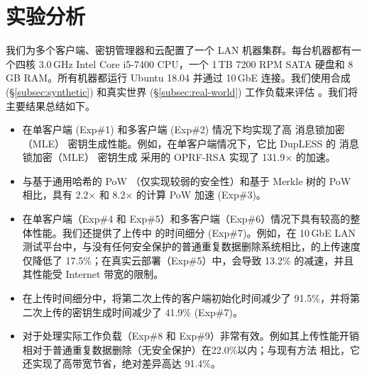 \section{实验分析}
\label{sec:evaluation}

我们为多个客户端、密钥管理器和云配置了一个 LAN 机器集群。每台机器都有一个四核 3.0\,GHz Intel Core i5-7400 CPU，一个 1\,TB 7200 RPM SATA 硬盘和 8\,GB RAM。所有机器都运行 Ubuntu 18.04 并通过 10\,GbE 连接。我们使用合成 (\S\ref{subsec:synthetic}) 和真实世界 (\S\ref{subsec:real-world}) 工作负载来评估 \sysnameS。我们将主要结果总结如下。

\begin{itemize}[leftmargin=*]
\item \sysnameS 在单客户端 (Exp\#1) 和多客户端 (Exp\#2) 情况下均实现了高 消息锁加密（MLE） 密钥生成性能。例如，在单客户端情况下，它比 DupLESS 的 消息锁加密（MLE） 密钥生成 \cite{bellare13b} 采用的 OPRF-RSA 实现了 131.9$\times$ 的加速。
\item \sysnameS 与基于通用哈希的 PoW \cite{xu13}（仅实现较弱的安全性）和基于 Merkle 树的 PoW \cite{halevi11} 相比，具有 2.2$\times$ 和 8.2$\times$ 的计算 PoW 加速 (Exp\#3)。
\item \sysnameS 在单客户端（Exp\#4 和 Exp\#5）和多客户端（Exp\#6）情况下具有较高的整体性能。我们还提供了上传中 \sysnameS 的时间细分 (Exp\#7)。例如，在 10\,GbE LAN 测试平台中，与没有任何安全保护的普通重复数据删除系统相比，\sysnameS 的上传速度仅降低了 17.5\%；在真实云部署（Exp\#5）中，\sysnameS 会导致 13.2\% 的减速，并且其性能受 Internet 带宽的限制。
\item 在上传时间细分中，\sysnameS 将第二次上传的客户端初始化时间减少了 91.5\%，并将第二次上传的密钥生成时间减少了 41.9\% (Exp\#7)。
\item \sysnameS 对于处理实际工作负载（Exp\#8 和 Exp\#9）非常有效。例如其上传性能开销相对于普通重复数据删除（无安全保护）在22.0\%以内；与现有方法 \cite{li15,harnik10} 相比，它还实现了高带宽节省，绝对差异高达 91.4\%。
\end{itemize}


